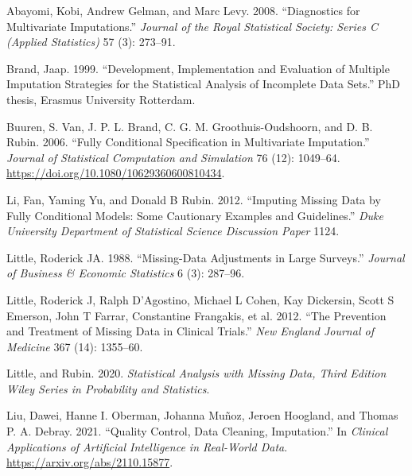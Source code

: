 \documentclass[
]{article}
\newlength{\cslhangindent}
\newlength{\cslentryspacingunit} %
\newenvironment{CSLReferences}[2] %
 {%
  \setlength{\parindent}{0pt}
  \ifodd #1
  \let\oldpar\par
  \def\par{\hangindent=\cslhangindent\oldpar}
  \fi
  \setlength{\parskip}{#2\cslentryspacingunit}
 }%
 {}
\begin{document}
\hypertarget{refs}{}
\begin{CSLReferences}{1}{0}
\leavevmode{}%
Abayomi, Kobi, Andrew Gelman, and Marc Levy. 2008. {``Diagnostics for
Multivariate Imputations.''} \emph{Journal of the Royal Statistical
Society: Series C (Applied Statistics)} 57 (3): 273--91.

\leavevmode{}%
Brand, Jaap. 1999. {``Development, Implementation and Evaluation of
Multiple Imputation Strategies for the Statistical Analysis of
Incomplete Data Sets.''} PhD thesis, Erasmus University Rotterdam.

\leavevmode{}%
Buuren, S. Van, J. P. L. Brand, C. G. M. Groothuis-Oudshoorn, and D. B.
Rubin. 2006. {``Fully Conditional Specification in Multivariate
Imputation.''} \emph{Journal of Statistical Computation and Simulation}
76 (12): 1049--64. \url{https://doi.org/10.1080/10629360600810434}.

\leavevmode{}%
Li, Fan, Yaming Yu, and Donald B Rubin. 2012. {``Imputing Missing Data
by Fully Conditional Models: {Some} Cautionary Examples and
Guidelines.''} \emph{Duke University Department of Statistical Science
Discussion Paper} 1124.

\leavevmode{}%
Little, Roderick JA. 1988. {``Missing-Data Adjustments in Large
Surveys.''} \emph{Journal of Business \& Economic Statistics} 6 (3):
287--96.

\leavevmode{}%
Little, Roderick J, Ralph D'Agostino, Michael L Cohen, Kay Dickersin,
Scott S Emerson, John T Farrar, Constantine Frangakis, et al. 2012.
{``The Prevention and Treatment of Missing Data in Clinical Trials.''}
\emph{New England Journal of Medicine} 367 (14): 1355--60.

\leavevmode{}%
Little, and Rubin. 2020. \emph{Statistical {Analysis} with {Missing
Data}, {Third Edition} \textbar{} {Wiley Series} in {Probability} and
{Statistics}}.

\leavevmode{}%
Liu, Dawei, Hanne I. Oberman, Johanna Muñoz, Jeroen Hoogland, and Thomas
P. A. Debray. 2021. {``Quality Control, Data Cleaning, Imputation.''} In
\emph{Clinical Applications of Artificial Intelligence in Real-World
Data}. \url{https://arxiv.org/abs/2110.15877}.


\end{CSLReferences}
\end{document}
